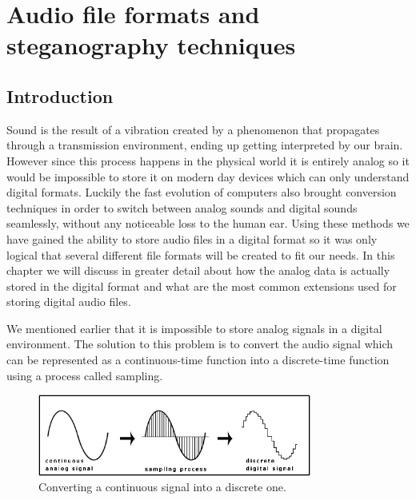 
\chapter{Audio file formats and steganography techniques}

\section{Introduction}
Sound is the result of a vibration created by a phenomenon that propagates through a transmission environment, ending up getting interpreted by our brain. However since this process happens in the physical world it is entirely analog so it would be impossible to store it on modern day devices which can only understand digital formats. Luckily the fast evolution of computers also brought conversion techniques in order to switch between analog sounds and digital sounds seamlessly, without any noticeable loss to the human ear. Using these methods we have gained the ability to store audio files in a digital format so it was only logical that several different file formats will be created to fit our needs. In this chapter we will discuss in greater detail about how the analog data is actually stored in the digital format and what are the most common extensions used for storing digital audio files.

We mentioned earlier that it is impossible to store analog signals in a digital environment. The solution to this problem is to convert the audio signal which can be represented as a continuous-time function into a discrete-time function using a process called sampling. 

\begin{figure}[H]
    \centering
    \includegraphics[width=9cm,keepaspectratio]{pics/Sampling-of-audio-signal.png}
    \caption{Converting a continuous signal into a discrete one\cite{real_time_audio_steganography}.}
    \label{sampling-graphic-example}
\end{figure}

